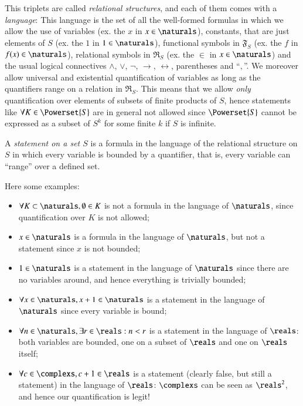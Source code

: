 \documentclass[adraft, copyright,creativecommons,sharealike,noncommercial]{eptcs}
\begin{document}
This triplets are called \emph{relational structures}, and each of them comes with a \emph{language}: 
This language is the set of all the well-formed formulas in which we allow the use of variables (ex. the $x$ in $x \in \naturals$), constants, that are just elements of $S$ (ex. the $1$ in $1 \in \naturals$), functional symbols in $\mathfrak{F}_S$ (ex. the $f$ in $f(x) \in \naturals$), relational symbols in $\mathfrak{R}_S$ (ex. the $\in$ in $x \in \naturals$) and the usual logical connectives $\wedge$, $\vee$, $\neg$, $\to$, $\leftrightarrow$, parentheses and ``$,$''. We moreover allow universal and existential quantification of variables as long as the quantifiers range on a relation in $\mathfrak{R}_S$.
This means that we allow \emph{only} quantification over elements of subsets of finite products of $S$, hence statements like $\forall K \in \Powerset{S}$ are in general not allowed since $\Powerset{S}$ cannot be expressed as a subset of $S^k$ for some finite $k$ if $S$ is infinite.

A \emph{statement on a set $S$} is a formula in the language of the relational structure on $S$ in which every variable is bounded by a quantifier, that is, every variable can ``range'' over a defined set.
\begin{example}
	Here some examples:
	\begin{itemize}
		\item $\forall K \subset \naturals, \emptyset \in K$ is not a formula in the language of $\naturals$, since quantification over $K$ is not allowed;
		\item $x \in \naturals$ is a formula in the language of $\naturals$, but not a statement since $x$ is not bounded;
		\item $1 \in \naturals$ is a statement in the language of $\naturals$ since there are no variables around, and hence everything is trivially bounded;
		\item $\forall x \in \naturals, x+1 \in \naturals$ is a statement in the language of $\naturals$ since every variable is bound;
		\item $\forall n \in \naturals, \exists r \in \reals : n<r$ is a statement in the language of $\reals$: both variables are bounded, one on a subset of $\reals$ and one on $\reals$ itself;
		\item $\forall c \in \complexs, c+1 \in \reals$ is a statement (clearly false, but still a statement) in the language of $\reals$: $\complexs$ can be seen as $\reals^2$, and hence our quantification is legit!
	\end{itemize}
\end{example}
%
%
\end{document}
